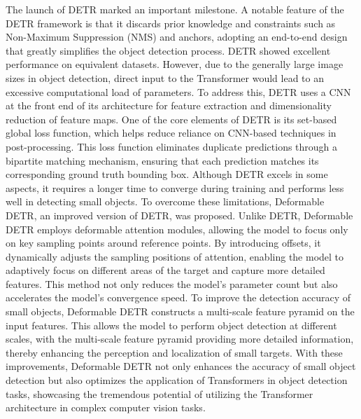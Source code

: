 \documentclass[journal]{IEEEtran}
\begin{document}
The launch of DETR marked an important milestone. A notable feature of the DETR framework is that it discards prior knowledge and constraints such as Non-Maximum Suppression (NMS) and anchors, adopting an end-to-end design that greatly simplifies the object detection process. DETR showed excellent performance on equivalent datasets. However, due to the generally large image sizes in object detection, direct input to the Transformer would lead to an excessive computational load of parameters. To address this, DETR uses a CNN at the front end of its architecture for feature extraction and dimensionality reduction of feature maps. One of the core elements of DETR is its set-based global loss function, which helps reduce reliance on CNN-based techniques in post-processing. This loss function eliminates duplicate predictions through a bipartite matching mechanism, ensuring that each prediction matches its corresponding ground truth bounding box. Although DETR excels in some aspects, it requires a longer time to converge during training and performs less well in detecting small objects. To overcome these limitations, Deformable DETR\cite{zhu2020deformable}, an improved version of DETR, was proposed. Unlike DETR, Deformable DETR employs deformable attention modules, allowing the model to focus only on key sampling points around reference points. By introducing offsets, it dynamically adjusts the sampling positions of attention, enabling the model to adaptively focus on different areas of the target and capture more detailed features. This method not only reduces the model’s parameter count but also accelerates the model’s convergence speed. To improve the detection accuracy of small objects, Deformable DETR constructs a multi-scale feature pyramid on the input features. This allows the model to perform object detection at different scales, with the multi-scale feature pyramid providing more detailed information, thereby enhancing the perception and localization of small targets. With these improvements, Deformable DETR not only enhances the accuracy of small object detection but also optimizes the application of Transformers in object detection tasks, showcasing the tremendous potential of utilizing the Transformer architecture in complex computer vision tasks.
\end{document}
